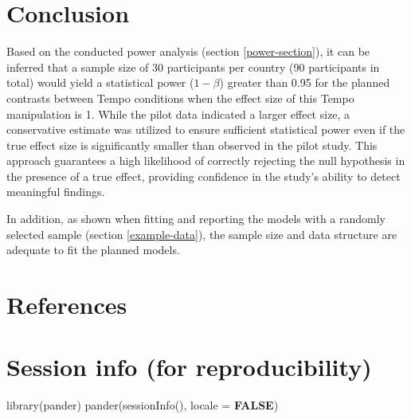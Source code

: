 \documentclass[
  bookmarksnumbered]{article}
\newenvironment{Shaded}{\begin{snugshade}}{\end{snugshade}}
\newcommand{\AttributeTok}[1]{\textcolor[rgb]{0.80,0.80,0.80}{#1}}
\newcommand{\ConstantTok}[1]{\textcolor[rgb]{0.86,0.64,0.64}{\textbf{#1}}}
\newcommand{\FunctionTok}[1]{\textcolor[rgb]{0.94,0.94,0.56}{#1}}
\newcommand{\NormalTok}[1]{\textcolor[rgb]{0.80,0.80,0.80}{#1}}
\begin{document}
\hypertarget{conclusion}{%
\section{Conclusion}\label{conclusion}}

Based on the conducted power analysis (section \ref{power-section}), it can be inferred that a sample size of 30 participants per country (90 participants in total) would yield a statistical power (\(1 - \beta\)) greater than 0.95 for the planned contrasts between Tempo conditions when the effect size of this Tempo manipulation is 1. While the pilot data indicated a larger effect size, a conservative estimate was utilized to ensure sufficient statistical power even if the true effect size is significantly smaller than observed in the pilot study. This approach guarantees a high likelihood of correctly rejecting the null hypothesis in the presence of a true effect, providing confidence in the study's ability to detect meaningful findings.

In addition, as shown when fitting and reporting the models with a randomly selected sample (section \ref{example-data}), the sample size and data structure are adequate to fit the planned models.

\hypertarget{refs}{%
\section*{References}\label{refs}}

\begin{multicols}{2}
\AtNextBibliography{\footnotesize}
\printbibliography[heading=none]
\normalsize
\end{multicols}

\def\printbibliography{}

\hypertarget{session}{%
\section*{Session info (for reproducibility)}\label{session}}

\begin{Shaded}
\begin{Highlighting}[]
\FunctionTok{library}\NormalTok{(pander)}
\FunctionTok{pander}\NormalTok{(}\FunctionTok{sessionInfo}\NormalTok{(), }\AttributeTok{locale =} \ConstantTok{FALSE}\NormalTok{)}
\end{Highlighting}
\end{Shaded}
\end{document}
